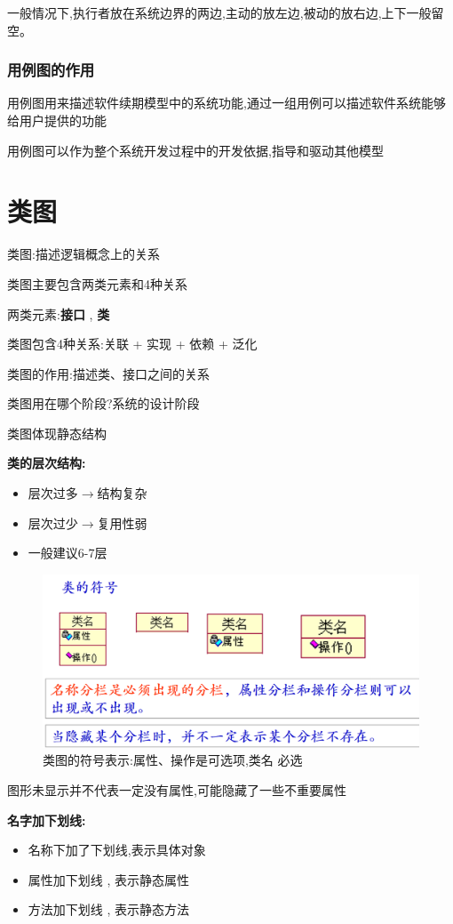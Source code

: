 \documentclass[UTF8,a4paper]{ctexart}
\begin{document}
一般情况下,执行者放在系统边界的两边,主动的放左边,被动的放右边,上下一般留空。

\subsubsection{用例图的作用}
用例图用来描述软件续期模型中的系统功能,通过一组用例可以描述软件系统能够给用户提供的功能

用例图可以作为整个系统开发过程中的开发依据,指导和驱动其他模型

\section{类图}
类图:描述逻辑概念上的关系

类图主要包含两类元素和4种关系

两类元素:\textbf{接口} , \textbf{类}

类图包含4种关系:关联 + 实现 + 依赖 + 泛化

类图的作用:描述类、接口之间的关系

类图用在哪个阶段?系统的设计阶段

类图体现静态结构

\textbf{类的层次结构:}
\begin{itemize}
  \item 层次过多$\to$结构复杂
  \item 层次过少$\to$复用性弱
  \item 一般建议6-7层
\end{itemize}

\begin{figure}[H]
  \centering
  \includegraphics[scale = 0.3]{assets/SoftwareEngineering_ce110.png}
  \caption{类图的符号表示:属性、操作是可选项,类名 必选}
\end{figure}
图形未显示并不代表一定没有属性,可能隐藏了一些不重要属性

\textbf{名字加下划线:}
\begin{itemize}
  \item 名称下加了下划线,表示具体对象
  \item 属性加下划线 , 表示静态属性
  \item 方法加下划线 , 表示静态方法
\end{itemize}
\end{document}
